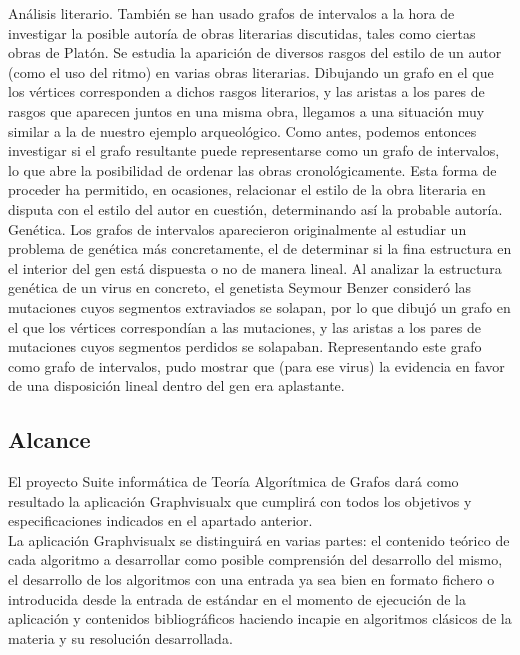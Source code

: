 \documentclass[a4paper,12pt]{article}
\begin{document}
Análisis literario. También se han usado grafos de intervalos a la hora de investigar la posible autoría de obras literarias discutidas, tales como ciertas obras de Platón. Se estudia la aparición de diversos rasgos del estilo de un autor (como el uso del ritmo) en varias obras literarias. Dibujando un grafo en el que los vértices corresponden a dichos rasgos literarios, y las aristas a los pares de rasgos que aparecen juntos en una misma obra, llegamos a una situación muy similar a la de nuestro ejemplo arqueológico. Como antes, podemos entonces investigar si el grafo resultante puede representarse como un grafo de intervalos, lo que abre la posibilidad de ordenar las obras cronológicamente. Esta forma de proceder ha permitido, en ocasiones, relacionar el estilo de la obra literaria en disputa con el estilo del autor en cuestión, determinando así la probable autoría.\\

Genética. Los grafos de intervalos aparecieron originalmente al estudiar un problema de genética más concretamente, el de determinar si la fina estructura en el interior del gen está dispuesta o no de manera lineal. Al analizar la estructura genética de un virus en concreto, el genetista Seymour Benzer consideró las mutaciones cuyos segmentos extraviados se solapan, por lo que dibujó un grafo en el que los vértices correspondían a las mutaciones, y las aristas a los pares de mutaciones cuyos segmentos perdidos se solapaban. Representando este grafo como grafo de intervalos, pudo mostrar que (para ese virus) la evidencia en favor de una disposición lineal dentro del gen era aplastante.\\

\subsection{Alcance}

El proyecto Suite informática de Teoría Algorítmica de Grafos dará como resultado la aplicación Graphvisualx que cumplirá con todos los objetivos y especificaciones indicados en el apartado anterior.\\

La aplicación Graphvisualx se distinguirá en varias partes: el contenido teórico de cada algoritmo a desarrollar como posible comprensión del desarrollo del mismo, el desarrollo de los algoritmos con una entrada ya sea bien en formato fichero o introducida desde la entrada de estándar en el momento de ejecución de la aplicación y contenidos bibliográficos haciendo incapie en algoritmos clásicos de la materia y su resolución desarrollada.\\
\end{document}
